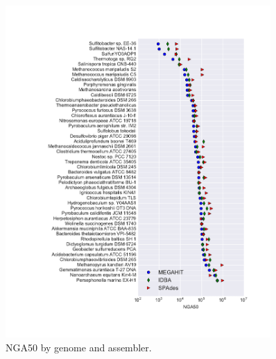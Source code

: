 \documentclass[10pt,a4paper,twocolumn]{article}
\begin{document}



\newpage

\begin{figure}[!h]
\centering
\includegraphics[width=0.9\textwidth]{nga50.pdf}  
\caption{NGA50 by genome and assembler.}
\label{fig:nga50}
\end{figure}
\end{document}
